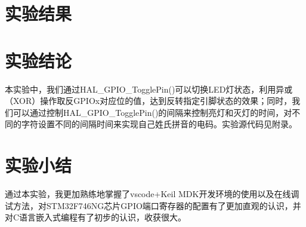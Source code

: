 ﻿\documentclass[UTF8,12pt]{article}
\begin{document}
\section{实验结果}


\section{实验结论}
本实验中，我们通过HAL\_GPIO\_TogglePin()可以切换LED灯状态，利用异或（XOR）操作取反GPIOx对应位的值，达到反转指定引脚状态的效果；同时，我们可以通过控制HAL\_GPIO\_TogglePin()的间隔来控制亮灯和灭灯的时间，对不同的字符设置不同的间隔时间来实现自己姓氏拼音的电码。实验源代码见附录。

\section{实验小结}
通过本实验，我更加熟练地掌握了vscode+Keil MDK开发环境的使用以及在线调试方法，对STM32F746NG芯片GPIO端口寄存器的配置有了更加直观的认识，并对C语言嵌入式编程有了初步的认识，收获很大。

\newpage
\end{document}
